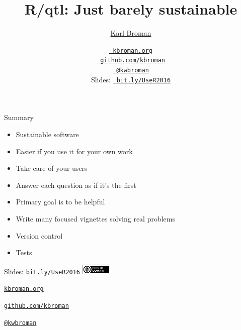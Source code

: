 \documentclass[12pt,t]{beamer}
\title{R/qtl: Just barely sustainable}
\author{\href{http://kbroman.org}{Karl Broman}}
\institute{Biostatistics \& Medical Informatics, UW{\textendash}Madison}
\date{\href{http://kbroman.org}{\tt \scriptsize \color{foreground} kbroman.org}
\\[-4pt]
\href{https://github.com/kbroman}{\tt \scriptsize \color{foreground} github.com/kbroman}
\\[-4pt]
\href{https://twitter.com/kwbroman}{\tt \scriptsize \color{foreground} @kwbroman}
\\[2pt]
\scriptsize {\lolit Slides:} \href{http://bit.ly/UseR2016}{\tt \scriptsize
  \color{foreground} bit.ly/UseR2016}
}
\begin{document}
{
 }




\begin{frame}[c]{Summary}

  \begin{itemize}
  \itemsep12pt
  \item Sustainable software
    \bi
    \item Easier if you use it for your own work
    \ei
  \item Take care of your users
    \bi
    \item Answer each question as if it's the first
    \item Primary goal is to be helpful
    \item Write many focused vignettes solving real problems
    \ei
  \item Version control
  \item Tests
  \end{itemize}

\end{frame}

\begin{frame}[c]{}

\Large

Slides: \href{http://bit.ly/UseR2016}{\tt bit.ly/UseR2016} \quad
\includegraphics[height=5mm]{Figs/cc-zero.png}

\vspace{10mm}

\href{http://kbroman.org}{\tt kbroman.org}

\vspace{10mm}

\href{https://github.com/kbroman}{\tt github.com/kbroman}

\vspace{10mm}

\href{https://twitter.com/kwbroman}{\tt @kwbroman}


\end{frame}
\end{document}
